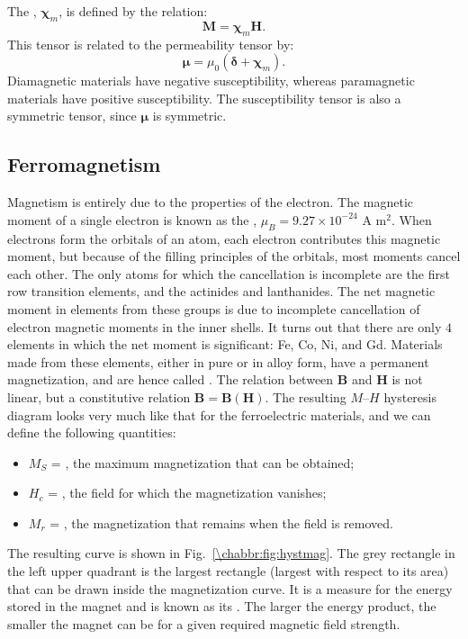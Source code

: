 The , $\bm{\chi}_m$, is defined by the relation:
\begin{equation}
	\mathbf{M} = \bm{\chi}_m\mathbf{H}.
\end{equation}
This tensor is related to the permeability tensor by:
\[
	\bm{\mu} = \mu_0(\bm{\delta}+\bm{\chi}_m).
\]
Diamagnetic materials have negative susceptibility, whereas paramagnetic materials have positive susceptibility. The susceptibility tensor is also a symmetric tensor, since $\bm{\mu}$ is symmetric.

\subsection{Ferromagnetism}

Magnetism is entirely due to the properties of the electron.  The magnetic moment of a single electron is known as the , $\mu_B = 9.27\times 10^{-24}$ A m$^2$.  When electrons form the orbitals of an atom, each electron contributes this magnetic moment, but because of the filling principles of the orbitals, most moments cancel each other.  The only atoms for which the cancellation is incomplete are the first row transition elements, and the actinides and lanthanides.  The net magnetic moment in elements from these groups is due to incomplete cancellation of electron magnetic moments in the inner shells.  It turns out that there are only $4$ elements in which the net moment is significant: Fe, Co, Ni, and Gd.  Materials made from these elements, either in pure or in alloy form, have a permanent magnetization, and are hence called .  The relation between $\mathbf{B}$ and $\mathbf{H}$ is not linear, but a constitutive relation $\mathbf{B} = \mathbf{B}(\mathbf{H})$.  The resulting $M$--$H$ hysteresis diagram looks very much like that for the ferroelectric materials, and we can define the following quantities:
\begin{itemize}
	\item $M_S$ = , the maximum magnetization that can be obtained;
	
	\item $H_c$ = , the field for which the magnetization vanishes;
	
	\item $M_r$ = , the magnetization that remains when the field is removed.
\end{itemize}
The resulting curve is shown in Fig.~\ref{\chabbr:fig:hystmag}.  The grey rectangle in the left upper quadrant is the largest rectangle (largest with respect to its area) that can be drawn inside the magnetization curve. It is a measure for the energy stored in the magnet and is known as its . The larger the energy product, the smaller the magnet can be for a given required magnetic field strength.

